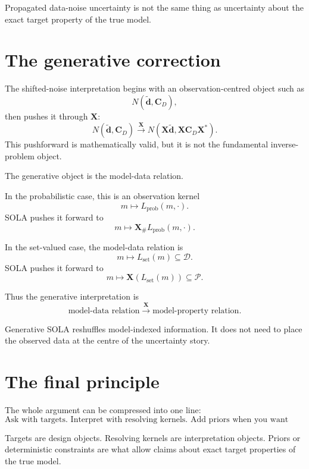 \documentclass[11pt,openany]{book}
\theoremstyle{definition}
\theoremstyle{remark}
\newcommand{\D}{\mathcal D}
\newcommand{\Pspace}{\mathcal P}
\begin{document}
\begin{lessonbox}
Propagated data-noise uncertainty is not the same thing as uncertainty about the exact target
property of the true model.
\end{lessonbox}

\section{The generative correction}

The shifted-noise interpretation begins with an observation-centred object such as
\[
  N(\widetilde{\mathbf d},\mathbf C_D),
\]
then pushes it through \(\mathbf X\):
\[
  N(\widetilde{\mathbf d},\mathbf C_D)
  \xrightarrow{\;\mathbf X\;}
  N(\mathbf X\widetilde{\mathbf d},\mathbf X\mathbf C_D\mathbf X^*).
\]
This pushforward is mathematically valid, but it is not the fundamental inverse-problem object.

The generative object is the model-data relation.

In the probabilistic case, this is an observation kernel
\[
  m\mapsto L_{\mathrm{prob}}(m,\cdot).
\]
SOLA pushes it forward to
\[
  m
  \mapsto
  \mathbf X_{\#}L_{\mathrm{prob}}(m,\cdot).
\]

In the set-valued case, the model-data relation is
\[
  m\mapsto L_{\mathrm{set}}(m)\subseteq\D.
\]
SOLA pushes it forward to
\[
  m
  \mapsto
  \mathbf X(L_{\mathrm{set}}(m))\subseteq\Pspace.
\]

Thus the generative interpretation is
\[
  \text{model-data relation}
  \xrightarrow{\;\mathbf X\;}
  \text{model-property relation}.
\]

\begin{lessonbox}
Generative SOLA reshuffles model-indexed information. It does not need to place the observed
data at the centre of the uncertainty story.
\end{lessonbox}

\section{The final principle}

The whole argument can be compressed into one line:
\[
  \boxed{
    \text{Ask with targets. Interpret with resolving kernels. Add priors when you want truth.}
  }
\]

Targets are design objects. Resolving kernels are interpretation objects. Priors or deterministic
constraints are what allow claims about exact target properties of the true model.
\end{document}
